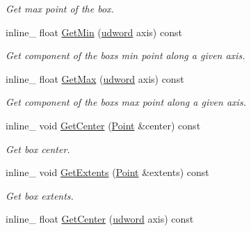 \begin{DoxyCompactItemize}
\begin{DoxyCompactList}\small\item\em Get max point of the box. \end{DoxyCompactList}\item 
inline\+\_\+ float \hyperlink{classAABB_ae0adf093a00a40712aa1d07cade6e48b}{Get\+Min} (\hyperlink{IceTypes_8h_a44c6f1920ba5551225fb534f9d1a1733}{udword} axis) const \hypertarget{classAABB_ae0adf093a00a40712aa1d07cade6e48b}{}\label{classAABB_ae0adf093a00a40712aa1d07cade6e48b}

\begin{DoxyCompactList}\small\item\em Get component of the box\textquotesingle{}s min point along a given axis. \end{DoxyCompactList}\item 
inline\+\_\+ float \hyperlink{classAABB_a36fdeb0316837b4a39b1a98b02dbbdcb}{Get\+Max} (\hyperlink{IceTypes_8h_a44c6f1920ba5551225fb534f9d1a1733}{udword} axis) const \hypertarget{classAABB_a36fdeb0316837b4a39b1a98b02dbbdcb}{}\label{classAABB_a36fdeb0316837b4a39b1a98b02dbbdcb}

\begin{DoxyCompactList}\small\item\em Get component of the box\textquotesingle{}s max point along a given axis. \end{DoxyCompactList}\item 
inline\+\_\+ void \hyperlink{classAABB_a96ae6fa137afbc679cef52948a4d365a}{Get\+Center} (\hyperlink{classPoint}{Point} \&center) const \hypertarget{classAABB_a96ae6fa137afbc679cef52948a4d365a}{}\label{classAABB_a96ae6fa137afbc679cef52948a4d365a}

\begin{DoxyCompactList}\small\item\em Get box center. \end{DoxyCompactList}\item 
inline\+\_\+ void \hyperlink{classAABB_ae10e5bc6ce234bb65595196f0c7670cd}{Get\+Extents} (\hyperlink{classPoint}{Point} \&extents) const \hypertarget{classAABB_ae10e5bc6ce234bb65595196f0c7670cd}{}\label{classAABB_ae10e5bc6ce234bb65595196f0c7670cd}

\begin{DoxyCompactList}\small\item\em Get box extents. \end{DoxyCompactList}\item 
inline\+\_\+ float \hyperlink{classAABB_aebbb26fe0c3d93c062d698e9c5b5a74e}{Get\+Center} (\hyperlink{IceTypes_8h_a44c6f1920ba5551225fb534f9d1a1733}{udword} axis) const \hypertarget{classAABB_aebbb26fe0c3d93c062d698e9c5b5a74e}{}\label{classAABB_aebbb26fe0c3d93c062d698e9c5b5a74e}


\end{DoxyCompactItemize}
